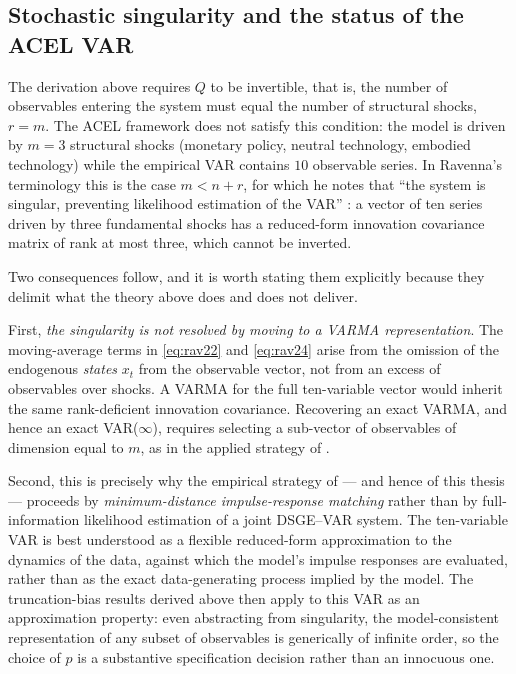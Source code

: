 \subsection{Stochastic singularity and the status of the ACEL VAR}
\label{sec:singularity}

The derivation above requires $Q$ to be invertible, that is, the number
of observables entering the system must equal the number of structural
shocks, $r = m$. The ACEL framework does not satisfy this condition: the
model is driven by $m = 3$ structural shocks (monetary policy, neutral
technology, embodied technology) while the empirical VAR contains
$10$ observable series. In Ravenna's terminology this is the case
$m < n + r$, for which he notes that ``the system is singular, preventing
likelihood estimation of the VAR'' \citep[p.~2050]{Ravenna2007}: a vector
of ten series driven by three fundamental shocks has a reduced-form
innovation covariance matrix of rank at most three, which cannot be
inverted.

Two consequences follow, and it is worth stating them explicitly because
they delimit what the theory above does and does not deliver.

First, \emph{the singularity is not resolved by moving to a VARMA
representation}. The moving-average terms in \eqref{eq:rav22} and
\eqref{eq:rav24} arise from the omission of the endogenous \emph{states}
$x_t$ from the observable vector, not from an excess of observables over
shocks. A VARMA for the full ten-variable vector would inherit the same
rank-deficient innovation covariance. Recovering an exact VARMA, and
hence an exact VAR($\infty$), requires selecting a sub-vector of
observables of dimension equal to $m$, as in the applied strategy of
\citet{CEV2006}.

Second, this is precisely why the empirical strategy of
\citet{Altigetal2011} --- and hence of this thesis --- proceeds by
\emph{minimum-distance impulse-response matching} rather than by
full-information likelihood estimation of a joint DSGE--VAR system. The
ten-variable VAR is best understood as a flexible reduced-form
approximation to the dynamics of the data, against which the model's
impulse responses are evaluated, rather than as the exact
data-generating process implied by the model. The truncation-bias results
derived above then apply to this VAR as an approximation property: even
abstracting from singularity, the model-consistent representation of any
subset of observables is generically of infinite order, so the choice of
$p$ is a substantive specification decision rather than an innocuous
one.

